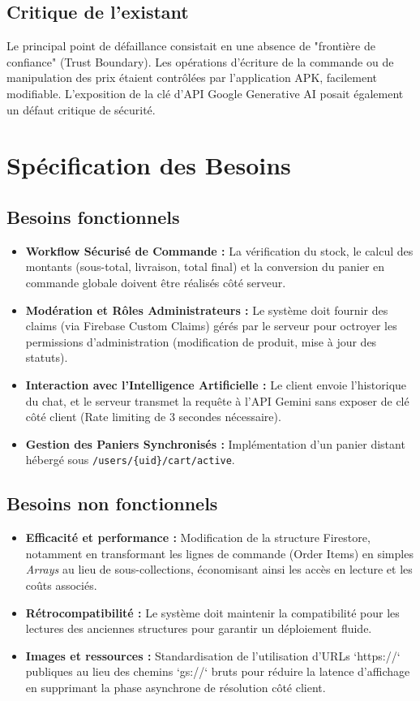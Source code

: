 \documentclass[12pt,a4paper]{report}
\begin{document}
\subsection{Critique de l'existant}
Le principal point de défaillance consistait en une absence de "frontière de confiance" (Trust Boundary). Les opérations d'écriture de la commande ou de manipulation des prix étaient contrôlées par l'application APK, facilement modifiable. L'exposition de la clé d'API Google Generative AI posait également un défaut critique de sécurité.

\section{Spécification des Besoins}

\subsection{Besoins fonctionnels}
\begin{itemize}
    \item \textbf{Workflow Sécurisé de Commande :} La vérification du stock, le calcul des montants (sous-total, livraison, total final) et la conversion du panier en commande globale doivent être réalisés côté serveur.
    \item \textbf{Modération et Rôles Administrateurs :} Le système doit fournir des claims (via Firebase Custom Claims) gérés par le serveur pour octroyer les permissions d'administration (modification de produit, mise à jour des statuts).
    \item \textbf{Interaction avec l'Intelligence Artificielle :} Le client envoie l'historique du chat, et le serveur transmet la requête à l'API Gemini sans exposer de clé côté client (Rate limiting de 3 secondes nécessaire).
    \item \textbf{Gestion des Paniers Synchronisés :} Implémentation d'un panier distant hébergé sous \texttt{/users/\{uid\}/cart/active}.
\end{itemize}

\subsection{Besoins non fonctionnels}
\begin{itemize}
    \item \textbf{Efficacité et performance :} Modification de la structure Firestore, notamment en transformant les lignes de commande (Order Items) en simples \textit{Arrays} au lieu de sous-collections, économisant ainsi les accès en lecture et les coûts associés.
    \item \textbf{Rétrocompatibilité :} Le système doit maintenir la compatibilité pour les lectures des anciennes structures pour garantir un déploiement fluide.
    \item \textbf{Images et ressources :} Standardisation de l'utilisation d'URLs `https://` publiques au lieu des chemins `gs://` bruts pour réduire la latence d'affichage en supprimant la phase asynchrone de résolution côté client.
\end{itemize}
\end{document}
